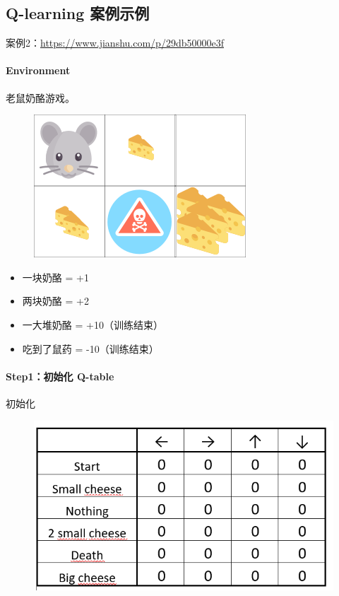 \documentclass[UTF8,a4paper,12pt]{ctexbook}
\begin{document}
	
		\subsection{Q-learning 案例示例}
		
			案例2：\url{https://www.jianshu.com/p/29db50000e3f}
		
			\paragraph{Environment}
				老鼠奶酪游戏。
				
				\begin{figure}[H]
					\centering
					\includegraphics[width=.4\linewidth]{qExample}
				\end{figure}
			
				\begin{itemize}
					\item 一块奶酪 = +1
					\item 两块奶酪 = +2
					\item 一大堆奶酪 = +10（训练结束）
					\item 吃到了鼠药 = -10（训练结束）
				\end{itemize}
			
			
			\paragraph{Step1：初始化 Q-table}
				初始化
				
				\begin{figure}[H]
					\centering
					\includegraphics[width=.7\linewidth]{qExample01}
				\end{figure}
			
\end{document}

